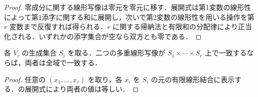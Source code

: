 \begin{proof}
零成分に関する線形写像は零元を零元に移す．展開式は第1変数の線形性によって第1添字に関する和に展開し，次いで第2変数の線形性を用いる操作を第 $r$ 変数まで反復すれば得られる．$r$ に関する帰納法と有限和の分配律により正当化される．いずれかの添字集合が空なら双方とも零である．
\end{proof}
\begin{prop}[生成集合上での多重線形写像の決定]
各 $V_i$ の生成集合 $S_i$ を取る．二つの多重線形写像が $S_1\times\cdots\times S_r$ 上で一致するならば，両者は全域で一致する．
\end{prop}
\begin{proof}
任意の $(x_1,\ldots,x_r)$ を取り，各 $x_i$ を $S_i$ の元の有限線形結合に表示する．の展開式により両者の値は等しい．
\end{proof}
